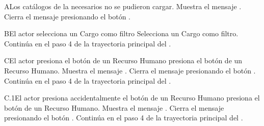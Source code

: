 \begin{UCtrayectoriaA}{A}{Los catálogos de la  necesarios no se pudieron cargar.}
    \UCpaso Muestra el mensaje .
    \UCpaso[\UCactor] Cierra el mensaje presionando el botón .
\end{UCtrayectoriaA}
\begin{UCtrayectoriaA}{B}{El actor selecciona un Cargo como filtro}
    \UCpaso[\UCactor] Selecciona un Cargo como filtro.
    \UCpaso Continúa en el paso 4 de la trayectoria principal del .
\end{UCtrayectoriaA}
\begin{UCtrayectoriaA}{C}{El actor presiona el botón  de un Recurso Humano}
    \UCpaso[\UCactor] presiona el botón  de un Recurso Humano.
    \UCpaso Muestra el mensaje .
    \UCpaso[\UCactor] Cierra el mensaje presionando el botón .
    \UCpaso Continúa en el paso 4 de la trayectoria principal del .
\end{UCtrayectoriaA}
\begin{UCtrayectoriaA}{C.1}{El actor presiona accidentalmente el botón  de un Recurso Humano}
    \UCpaso[\UCactor] presiona el botón  de un Recurso Humano.
    \UCpaso Muestra el mensaje .
    \UCpaso[\UCactor] Cierra el mensaje presionando el botón .
    \UCpaso Continúa en el paso 4 de la trayectoria principal del .
\end{UCtrayectoriaA}